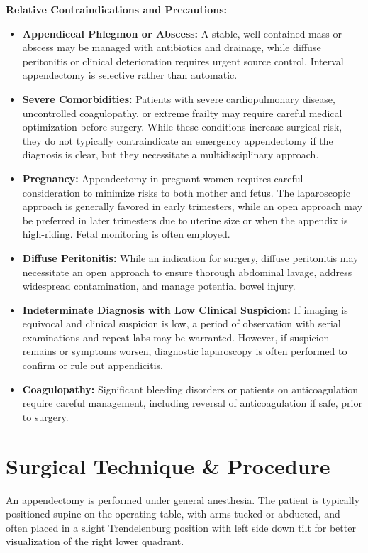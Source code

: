 \textbf{Relative Contraindications and Precautions:}
\begin{itemize}
  \item \textbf{Appendiceal Phlegmon or Abscess:} A stable, well-contained mass or abscess may be managed with antibiotics and drainage, while diffuse peritonitis or clinical deterioration requires urgent source control. Interval appendectomy is selective rather than automatic.
  \item \textbf{Severe Comorbidities:} Patients with severe cardiopulmonary disease, uncontrolled coagulopathy, or extreme frailty may require careful medical optimization before surgery. While these conditions increase surgical risk, they do not typically contraindicate an emergency appendectomy if the diagnosis is clear, but they necessitate a multidisciplinary approach.
  \item \textbf{Pregnancy:} Appendectomy in pregnant women requires careful consideration to minimize risks to both mother and fetus. The laparoscopic approach is generally favored in early trimesters, while an open approach may be preferred in later trimesters due to uterine size or when the appendix is high-riding. Fetal monitoring is often employed.
  \item \textbf{Diffuse Peritonitis:} While an indication for surgery, diffuse peritonitis may necessitate an open approach to ensure thorough abdominal lavage, address widespread contamination, and manage potential bowel injury.
  \item \textbf{Indeterminate Diagnosis with Low Clinical Suspicion:} If imaging is equivocal and clinical suspicion is low, a period of observation with serial examinations and repeat labs may be warranted. However, if suspicion remains or symptoms worsen, diagnostic laparoscopy is often performed to confirm or rule out appendicitis.
\item \textbf{Coagulopathy:} Significant bleeding disorders or patients on anticoagulation require careful management, including reversal of anticoagulation if safe, prior to surgery.
\end{itemize}

\section*{Surgical Technique \& Procedure}
An appendectomy is performed under general anesthesia. The patient is typically positioned supine on the operating table, with arms tucked or abducted, and often placed in a slight Trendelenburg position with left side down tilt for better visualization of the right lower quadrant.

